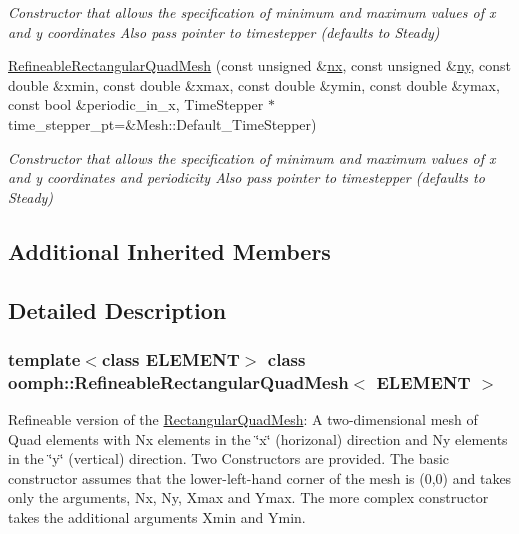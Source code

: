 \begin{DoxyCompactItemize}
\begin{DoxyCompactList}\small\item\em Constructor that allows the specification of minimum and maximum values of x and y coordinates Also pass pointer to timestepper (defaults to Steady) \end{DoxyCompactList}\item 
\hyperlink{classoomph_1_1RefineableRectangularQuadMesh_a4d9b146956f5b6c4df25afe9cb2a6e96}{Refineable\+Rectangular\+Quad\+Mesh} (const unsigned \&\hyperlink{classoomph_1_1RectangularQuadMesh_abfef93d6322886cdce14a437186e4821}{nx}, const unsigned \&\hyperlink{classoomph_1_1RectangularQuadMesh_a86d76a55eb7c4e8bca9b74d23c8b0412}{ny}, const double \&xmin, const double \&xmax, const double \&ymin, const double \&ymax, const bool \&periodic\+\_\+in\+\_\+x, Time\+Stepper $\ast$time\+\_\+stepper\+\_\+pt=\&Mesh\+::\+Default\+\_\+\+Time\+Stepper)
\begin{DoxyCompactList}\small\item\em Constructor that allows the specification of minimum and maximum values of x and y coordinates and periodicity Also pass pointer to timestepper (defaults to Steady) \end{DoxyCompactList}\end{DoxyCompactItemize}
\subsection*{Additional Inherited Members}


\subsection{Detailed Description}
\subsubsection*{template$<$class E\+L\+E\+M\+E\+NT$>$\newline
class oomph\+::\+Refineable\+Rectangular\+Quad\+Mesh$<$ E\+L\+E\+M\+E\+N\+T $>$}

Refineable version of the \hyperlink{classoomph_1_1RectangularQuadMesh}{Rectangular\+Quad\+Mesh}\+: A two-\/dimensional mesh of Quad elements with Nx elements in the \char`\"{}x\char`\"{} (horizonal) direction and Ny elements in the \char`\"{}y\char`\"{} (vertical) direction. Two Constructors are provided. The basic constructor assumes that the lower-\/left-\/hand corner of the mesh is (0,0) and takes only the arguments, Nx, Ny, Xmax and Ymax. The more complex constructor takes the additional arguments Xmin and Ymin.

